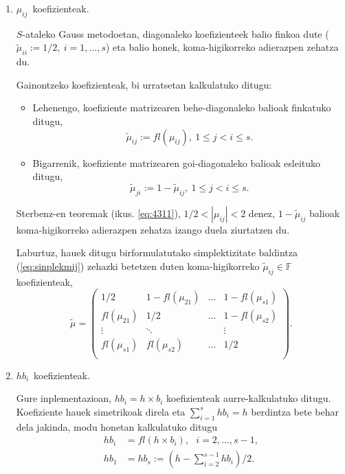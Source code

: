 \begin{enumerate}
\item $\mu_{ij}$~koefizienteak.

$S$-ataleko Gauss metodoetan, diagonaleko koefizienteek  balio finkoa dute ($\tilde{\mu}_{ii}:=1/2, \ i=1,\dots,s$) eta balio honek, koma-higikorreko adierazpen zehatza du.

Gainontzeko koefizienteak, bi urratsetan kalkulatuko ditugu:
\begin{itemize}
\item Lehenengo, koefiziente matrizearen behe-diagonaleko balioak finkatuko ditugu,
\begin{equation*}
 \tilde{\mu}_{ij}:=fl(\mu_{ij}), \ 1 \leqslant j < i \leqslant s.
\end{equation*}

\item Bigarrenik, koefiziente matrizearen goi-diagonaleko balioak esleituko ditugu,
\begin{equation*}
\tilde{\mu}_{ji}:=1-\tilde{\mu}_{ij} , \ 1 \leqslant j < i \leqslant s.
\end{equation*}

\end{itemize}
Sterbenz-en teoremak (ikus. \ref{eq:4311}), $1/2 < |\mu_{ij}| <2$ denez, $1-\tilde{\mu}_{ij}$ balioak koma-higikorreko adierazpen zehatza izango duela ziurtatzen du. 

Laburtuz, hauek ditugu birformulatutako simplektizitate baldintza (\ref{eq:sinplekmij}) zehazki betetzen duten koma-higikorreko $\tilde{\mu}_{ij}\in \mathbb{F}$ koefizienteak,   
\begin{equation}
\tilde{\mu}=\left(\begin{array}{cccc}
    1/2       & 1-fl(\mu_{21}) & \dots & 1-fl(\mu_{s1})      \\
    fl(\mu_{21})      & 1/2    & \dots & 1-fl(\mu_{s2})      \\
    \vdots            & \ddots         &       & \vdots      \\
    fl(\mu_{s1})      & fl(\mu_{s2})   & \dots & 1/2          \\ 
     \end{array}\right).
\end{equation}

\item $hb_{i}$~koefizienteak.

Gure inplementazioan, $hb_i=h \times b_i$ koefizienteak aurre-kalkulatuko ditugu. Koefiziente hauek simetrikoak direla eta  $\sum\limits_{i=1}^{s} hb_i=h$ berdintza bete behar dela jakinda, modu honetan kalkulatuko ditugu
\begin{align*}
hb_i & = fl(h \times b_i), \ \ \ i=2,\dots,s-1, \\
hb_1 & =hb_s:= \left(h - \sum\limits_{i=2}^{s-1} hb_i \right)/2.
\end{align*}


\end{enumerate}
